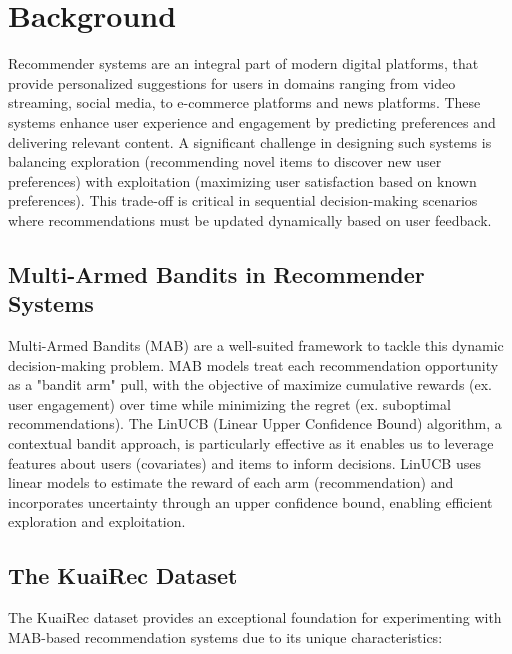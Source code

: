 \section{Background}

Recommender systems are an integral part of modern digital platforms, that provide personalized suggestions for users in domains ranging from video streaming, social media, to e-commerce platforms and news platforms. These systems enhance user experience and engagement by predicting preferences and delivering relevant content. A significant challenge in designing such systems is balancing exploration (recommending novel items to discover new user preferences) with exploitation (maximizing user satisfaction based on known preferences). This trade-off is critical in sequential decision-making scenarios where recommendations must be updated dynamically based on user feedback. 

\subsection{Multi-Armed Bandits in Recommender Systems}
Multi-Armed Bandits (MAB) are a well-suited framework to tackle this dynamic decision-making problem. MAB models treat each recommendation opportunity as a "bandit arm" pull, with the objective of maximize cumulative rewards (ex. user engagement) over time while minimizing the regret (ex. suboptimal recommendations). The LinUCB (Linear Upper Confidence Bound) algorithm, a contextual bandit approach, is particularly effective as it enables us to leverage features about users (covariates) and items to inform decisions. LinUCB uses linear models to estimate the reward of each arm (recommendation) and incorporates uncertainty through an upper confidence bound, enabling efficient exploration and exploitation.

\subsection{The KuaiRec Dataset}

The KuaiRec dataset provides an exceptional foundation for experimenting with MAB-based recommendation systems due to its unique characteristics:

